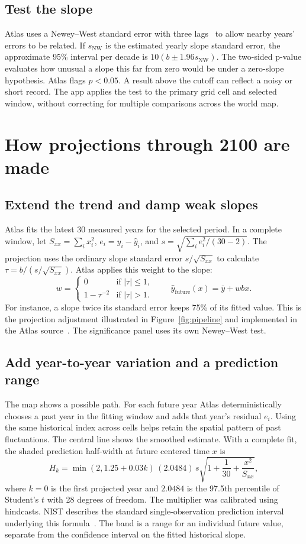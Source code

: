 \documentclass[11pt,letterpaper]{article}
\begin{document}
\subsection{Test the slope}
Atlas uses a Newey--West standard error with three lags~\cite{newey-west} to allow nearby years' errors to be related. If \(s_{\mathrm{NW}}\) is the estimated yearly slope standard error, the approximate 95\% interval per decade is \(10(b\pm1.96s_{\mathrm{NW}})\). The two-sided p-value evaluates how unusual a slope this far from zero would be under a zero-slope hypothesis. Atlas flags \(p<0.05\). A result above the cutoff can reflect a noisy or short record. The app applies the test to the primary grid cell and selected window, without correcting for multiple comparisons across the world map.

\clearpage
\section{How projections through 2100 are made}
\subsection{Extend the trend and damp weak slopes}
Atlas fits the latest 30 measured years for the selected period. In a complete window, let \(S_{xx}=\sum_i x_i^2\), \(e_i=y_i-\hat y_i\), and \(s=\sqrt{\sum_i e_i^2/(30-2)}\). The projection uses the ordinary slope standard error \(s/\sqrt{S_{xx}}\) to calculate \(\tau=b/(s/\sqrt{S_{xx}})\). Atlas applies this weight to the slope:
\[
 w =
 \begin{cases}
 0 & \text{if }|\tau|\le 1,\\
 1-\tau^{-2} & \text{if }|\tau|>1.
 \end{cases}
 \qquad
 \hat y_{\text{future}}(x)=\bar y+w b x.
\]
For instance, a slope twice its standard error keeps 75\% of its fitted value. This is the projection adjustment illustrated in Figure~\ref{fig:pipeline} and implemented in the Atlas source~\cite{atlas-statistics}. The significance panel uses its own Newey--West test.

\subsection{Add year-to-year variation and a prediction range}
The map shows a possible path. For each future year Atlas deterministically chooses a past year in the fitting window and adds that year's residual \(e_i\). Using the same historical index across cells helps retain the spatial pattern of past fluctuations. The central line shows the smoothed estimate. With a complete fit, the shaded prediction half-width at future centered time \(x\) is
\[
 H_k=\min(2,1.25+0.03k)\,(2.0484)\,s
      \sqrt{1+\frac{1}{30}+\frac{x^2}{S_{xx}}},
\]
where \(k=0\) is the first projected year and \(2.0484\) is the 97.5th percentile of Student's \(t\) with 28 degrees of freedom. The multiplier was calibrated using hindcasts. NIST describes the standard single-observation prediction interval underlying this formula~\cite{nist-prediction}. The band is a range for an individual future value, separate from the confidence interval on the fitted historical slope.
\end{document}

